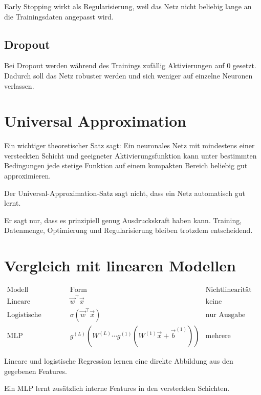 \begin{conceptbox}
Early Stopping wirkt als Regularisierung, weil das Netz nicht beliebig lange an die Trainingsdaten angepasst wird.
\end{conceptbox}

\subsection{Dropout}

Bei Dropout werden während des Trainings zufällig Aktivierungen auf \(0\) gesetzt.
Dadurch soll das Netz robuster werden und sich weniger auf einzelne Neuronen verlassen.

\section{Universal Approximation}

Ein wichtiger theoretischer Satz sagt:
Ein neuronales Netz mit mindestens einer versteckten Schicht und geeigneter Aktivierungsfunktion kann unter bestimmten Bedingungen jede stetige Funktion auf einem kompakten Bereich beliebig gut approximieren.

\begin{conceptbox}
Der Universal-Approximation-Satz sagt nicht, dass ein Netz automatisch gut lernt.

Er sagt nur, dass es prinzipiell genug Ausdruckskraft haben kann.
Training, Datenmenge, Optimierung und Regularisierung bleiben trotzdem entscheidend.
\end{conceptbox}

\section{Vergleich mit linearen Modellen}

\[
\begin{array}{c|c|c}
\text{Modell}
&
\text{Form}
&
\text{Nichtlinearität}
\\
\hline
\text{Lineare Regression}
&
\vec{w}^{\top}\vec{x}
&
\text{keine}
\\
\hline
\text{Logistische Regression}
&
\sigma(\vec{w}^{\top}\vec{x})
&
\text{nur Ausgabe}
\\
\hline
\text{MLP}
&
g^{(L)}(W^{(L)}\cdots g^{(1)}(W^{(1)}\vec{x}+\vec{b}^{(1)}))
&
\text{mehrere Schichten}
\end{array}
\]

\begin{conceptbox}
Lineare und logistische Regression lernen eine direkte Abbildung aus den gegebenen Features.

Ein MLP lernt zusätzlich interne Features in den versteckten Schichten.
\end{conceptbox}

